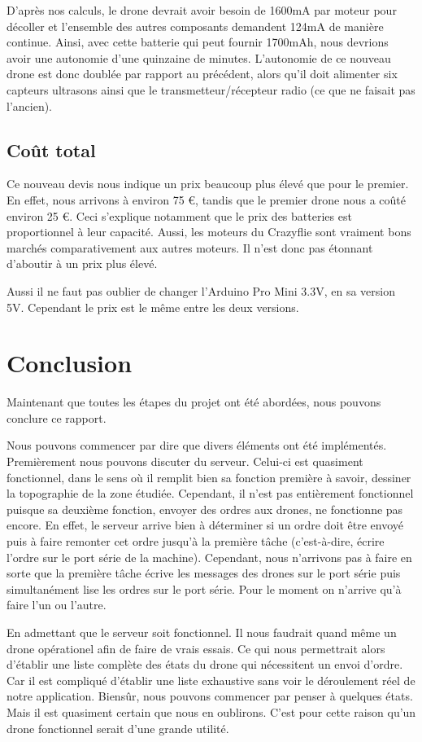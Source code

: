\documentclass[a4paper,10pt]{report}
\begin{document}
      D'après nos calculs, le drone devrait avoir besoin de 1600mA par moteur 
pour décoller et l'ensemble des autres composants demandent 124mA de manière 
continue. Ainsi, avec cette batterie qui peut fournir 1700mAh, nous devrions 
avoir une autonomie d'une quinzaine de minutes. L'autonomie de ce nouveau drone 
est donc doublée par rapport au précédent, alors qu'il doit alimenter six 
capteurs ultrasons ainsi que le transmetteur/récepteur radio (ce que ne faisait 
pas l'ancien).

    \section{Coût total}
      Ce nouveau devis nous indique un prix beaucoup plus élevé que pour le 
premier. En effet, nous arrivons à environ 75 \euro, tandis que le premier 
drone nous a coûté environ 25 \euro. Ceci s'explique notamment que le prix des 
batteries est proportionnel à leur capacité. Aussi, les moteurs du Crazyflie 
sont vraiment bons marchés comparativement aux autres moteurs. Il n'est donc 
pas étonnant d'aboutir à un prix plus élevé.

      Aussi il ne faut pas oublier de changer l'Arduino Pro Mini 3.3V, en sa 
version 5V. Cependant le prix est le même entre les deux versions.
  
  \chapter{Conclusion}
    Maintenant que toutes les étapes du projet ont été abordées, nous pouvons 
conclure ce rapport.

    Nous pouvons commencer par dire que divers éléments ont été implémentés. 
Premièrement nous pouvons discuter du serveur. Celui-ci est quasiment 
fonctionnel, dans le sens où il remplit bien sa fonction première à savoir, 
dessiner la topographie de la zone étudiée. Cependant, il n'est pas entièrement 
fonctionnel puisque sa deuxième fonction, envoyer des ordres aux drones, ne 
fonctionne pas encore. En effet, le serveur arrive bien à déterminer si un 
ordre 
doit être envoyé puis à faire remonter cet ordre jusqu'à la première tâche 
(c'est-à-dire, écrire l'ordre sur le port série de la machine). Cependant, nous 
n'arrivons pas à faire en sorte que la première tâche écrive les messages des 
drones sur le port série puis simultanément lise les ordres sur le port série. 
Pour le moment on n'arrive qu'à faire l'un ou l'autre.

    En admettant que le serveur soit fonctionnel. Il nous faudrait quand même 
un drone opérationel afin de faire de vrais essais. Ce qui nous permettrait 
alors d'établir une liste complète des états du drone qui nécessitent un envoi 
d'ordre. Car il est compliqué d'établir une liste exhaustive sans voir le 
déroulement réel de notre application. Biensûr, nous pouvons commencer par 
penser à quelques états. Mais il est quasiment certain que nous en oublirons. 
C'est pour cette raison qu'un drone fonctionnel serait d'une grande utilité. 
\end{document}
